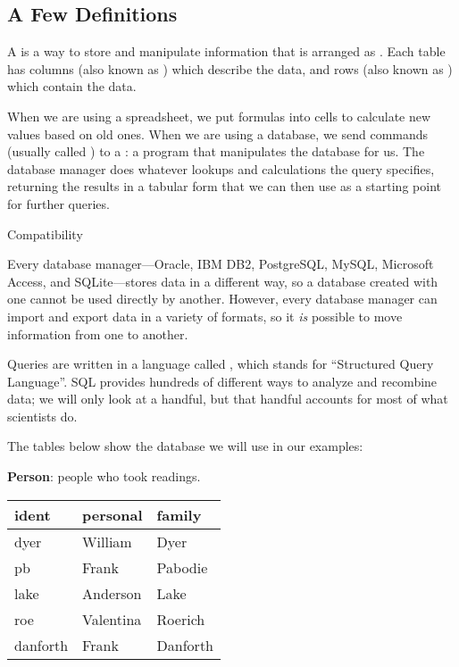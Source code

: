 \subsection{A Few Definitions}

A  is a way to
store and manipulate information that is arranged as
. Each table has columns (also known
as ) which describe the data, and
rows (also known as ) which contain
the data.

When we are using a spreadsheet, we put formulas into cells to calculate
new values based on old ones. When we are using a database, we send
commands (usually called ) to a
: a program that
manipulates the database for us. The database manager does whatever
lookups and calculations the query specifies, returning the results in a
tabular form that we can then use as a starting point for further
queries.

\begin{swcbox}{Compatibility}

Every database manager---Oracle, IBM DB2, PostgreSQL, MySQL, Microsoft
Access, and SQLite---stores data in a different way, so a database
created with one cannot be used directly by another. However, every
database manager can import and export data in a variety of formats, so
it \emph{is} possible to move information from one to another.

\end{swcbox}

Queries are written in a language called , which
stands for ``Structured Query Language''. SQL provides hundreds of
different ways to analyze and recombine data; we will only look at a
handful, but that handful accounts for most of what scientists do.

The tables below show the database we will use in our examples:

\textbf{Person}: people who took readings.

\begin{tabular}{lll}
ident & personal & family \\
\hline
dyer & William & Dyer \\
pb & Frank & Pabodie \\
lake & Anderson & Lake \\
roe & Valentina & Roerich \\
danforth & Frank & Danforth \\
\end{tabular}

